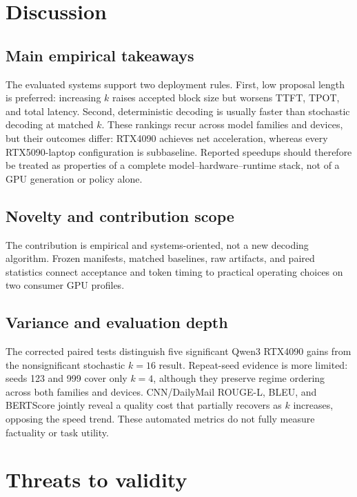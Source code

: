 \section{Discussion}
\label{sec:discussion}

\subsection{Main empirical takeaways}

The evaluated systems support two deployment rules. First, low proposal
length is preferred: increasing $k$ raises accepted block size but worsens
TTFT, TPOT, and total latency. Second, deterministic decoding is usually
faster than stochastic decoding at matched $k$. These rankings recur across
model families and devices, but their outcomes differ: RTX4090 achieves net
acceleration, whereas every RTX5090-laptop configuration is subbaseline.
Reported speedups should therefore be treated as properties of a complete
model--hardware--runtime stack, not of a GPU generation or policy alone.

\subsection{Novelty and contribution scope}

The contribution is empirical and systems-oriented, not a new decoding
algorithm. Frozen manifests, matched baselines, raw artifacts, and paired
statistics connect acceptance and token timing to practical operating choices
on two consumer GPU profiles.

\subsection{Variance and evaluation depth}

The corrected paired tests distinguish five significant Qwen3 RTX4090 gains
from the nonsignificant stochastic $k{=}16$ result. Repeat-seed evidence is
more limited: seeds 123 and 999 cover only $k{=}4$, although they preserve
regime ordering across both families and devices. CNN/DailyMail ROUGE-L,
BLEU, and BERTScore jointly reveal a quality cost that partially recovers as
$k$ increases, opposing the speed trend. These automated metrics do not fully
measure factuality or task utility.

\section{Threats to validity}
\label{sec:threats}

